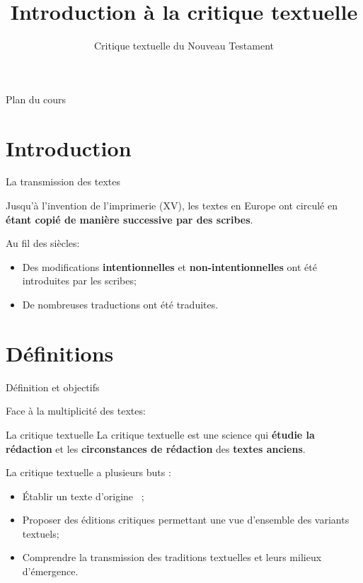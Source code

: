 \documentclass[11pt]{beamer}
\begin{document}
\title{Introduction à la critique textuelle}
\subtitle{Critique textuelle du Nouveau Testament}

\begin{frame}{}
    \titlepage
\end{frame}

\begin{frame}{Plan du cours}
\tableofcontents
\end{frame}

\section{Introduction}

\begin{frame}{La transmission des textes}
    \begin{block}{}
        Jusqu'à l'invention de l'imprimerie (XV\ieme{}), les textes en Europe ont circulé en \textbf{étant copié de manière successive par des scribes}.
    \end{block}
    Au fil des siècles:
    \begin{itemize}
        \item Des modifications \textbf{intentionnelles} et \textbf{non-intentionnelles} ont été introduites par les scribes;
        \item De nombreuses traductions ont été traduites.
    \end{itemize}
\end{frame}

\section{Définitions}




\begin{frame}{Définition et objectifs}

    Face à la multiplicité des textes:

    \begin{alertblock}{La critique textuelle}
        La critique textuelle est une science qui \textbf{étudie la rédaction} et les \textbf{circonstances de rédaction} des \textbf{textes anciens}.
    \end{alertblock}
    \pause

        La critique textuelle a plusieurs buts :
    \begin{itemize}

        \item Établir un texte \og d'origine \fg\ ;
        \pause
        \item Proposer des éditions critiques permettant une vue d'ensemble des variants textuels;
        \pause
        \item Comprendre la transmission des traditions textuelles et leurs milieux d'émergence.
    \end{itemize}
\end{frame}
\end{document}
